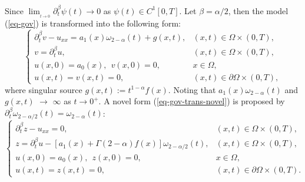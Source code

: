 \documentclass[11pt]{article}
\numberwithin{equation}{section}
\begin{document}
Since $\lim_{_{t\rightarrow 0}}\partial_t^\beta \psi(t)\rightarrow0$ as $\psi(t)\in C^1[0,T]$. Let $\beta=\alpha/2$, then the model (\ref{eq-gov}) is transformed into the following form:
\begin{equation}\label{eq-gov-trans}
\begin{cases}
  \partial_t^\beta v - u_{xx} = a_1(x)\omega_{2-\alpha}(t)+g(x,t), & (x,t) \in \Omega \times (0,T), \\
  v  = \partial_t^\beta u, & (x,t) \in \Omega \times (0,T), \\
  u(x,0) =a_0(x),~~ v(x,0)=0, & x \in \Omega, \\
  u(x,t) = v(x,t)=0, & (x,t) \in \partial \Omega \times (0,T),
\end{cases}
\end{equation}
where singular source $g(x,t):=t^{1-\alpha}f(x)$. Noting that $a_1(x)\omega_{2-\alpha}(t)$ and $g(x,t)$ $\rightarrow$ $\infty$ as $t\rightarrow0^+$.
A novel form (\ref{eq-gov-trans-novel}) is proposed by $\partial_t^\beta \omega_{2-\alpha/2}(t)=\omega_{2-\alpha}(t)$:
\begin{equation}\label{eq-gov-trans-novel}
\begin{cases}
  \partial_t^\beta z - u_{xx} = 0, & (x,t) \in \Omega \times (0,T), \\
  z  = \partial_t^\beta u-[a_1(x)+\Gamma{(2-\alpha)}f(x)]\omega_{2-\alpha/2}(t), & (x,t) \in \Omega \times (0,T), \\
  u(x,0) =a_0(x),~~ z(x,0)=0, & x \in \Omega, \\
  u(x,t) = z(x,t)=0, & (x,t) \in \partial \Omega \times (0,T).
\end{cases}
\end{equation}
\end{document}
